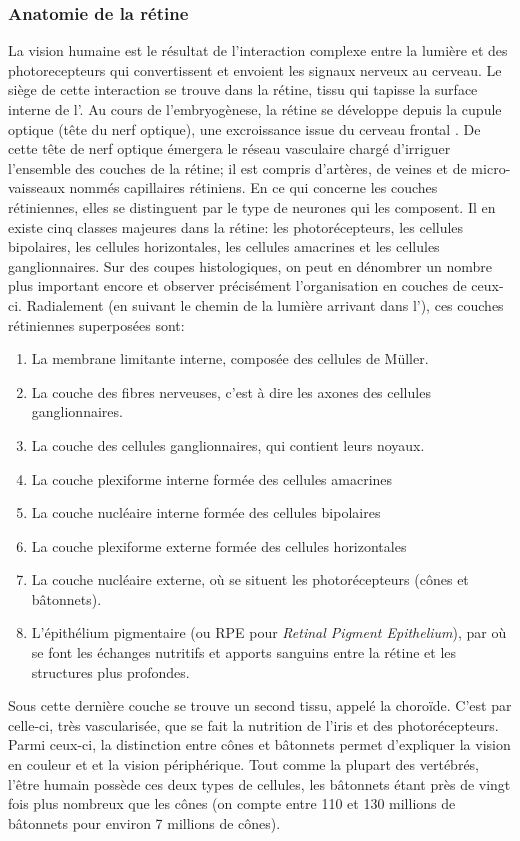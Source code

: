 \subsubsection{Anatomie  de la rétine}
\label{sec:AnatRetina}
La vision humaine est le résultat de l'interaction complexe entre la lumière et des photorecepteurs qui convertissent et envoient les signaux nerveux au cerveau. Le siège de cette interaction se trouve dans la rétine, tissu qui tapisse la surface interne de l'\oeil. Au cours de l'embryogènese, la rétine se développe depuis la cupule optique (tête du nerf optique), une excroissance issue du cerveau frontal \cite{willoughbyAnatomyPhysiologyHuman2010}. De cette tête de nerf optique émergera le réseau vasculaire chargé d'irriguer l'ensemble des couches de la rétine; il est compris d'artères, de veines et de micro-vaisseaux nommés capillaires rétiniens. En ce qui concerne les couches rétiniennes, elles se distinguent par le type de neurones qui les composent. Il en existe cinq classes majeures dans la rétine: les photorécepteurs, les cellules bipolaires, les cellules horizontales, les cellules amacrines et les cellules ganglionnaires. Sur des coupes histologiques, on peut en dénombrer un nombre plus important encore et observer précisément l'organisation en couches de ceux-ci.
Radialement (en suivant le chemin de la lumière  arrivant dans l'\oeil), ces couches rétiniennes superposées sont:
\begin{enumerate}
	\item La membrane limitante interne, composée des cellules de Müller.
	\item La couche des fibres nerveuses, c'est à dire les axones des cellules ganglionnaires. 
	\item La couche des cellules ganglionnaires, qui contient leurs noyaux.
	\item La couche plexiforme interne formée des cellules amacrines
	\item La couche nucléaire interne formée des cellules bipolaires
	\item La couche plexiforme externe formée des cellules horizontales
	\item La couche nucléaire externe, où se situent les photorécepteurs (cônes et bâtonnets).
	\item L'épithélium pigmentaire (ou RPE pour \textit{Retinal Pigment Epithelium}), par où se font les échanges nutritifs et apports sanguins entre la rétine et les structures plus profondes.
\end{enumerate}
Sous cette dernière couche se trouve un second tissu, appelé la choroïde. C'est par celle-ci, très vascularisée, que se fait la nutrition de l'iris et des photorécepteurs. Parmi ceux-ci, la distinction entre cônes et bâtonnets permet d'expliquer la vision en couleur et et la vision périphérique. Tout comme la plupart des vertébrés, l'être humain possède ces deux types de cellules, les bâtonnets étant près de vingt fois plus nombreux que les cônes (on compte entre 110 et 130 millions de bâtonnets pour environ 7 millions de cônes). 
